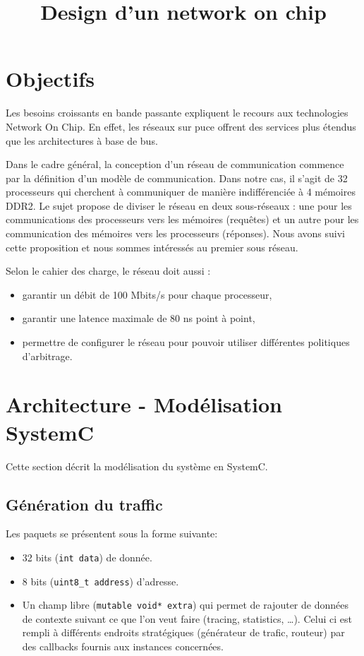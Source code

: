 \documentclass[11pt]{article}
\title{Design d'un network on chip}
\begin{document}
\maketitle

\section{Objectifs}

Les besoins croissants en bande passante expliquent le recours
aux technologies Network On Chip. En effet, les réseaux sur puce offrent des
services plus étendus que les architectures à base de bus.


Dans le cadre général, la conception d'un réseau de communication commence
par la définition d'un modèle de communication. Dans notre cas, il s'agit de 32
processeurs qui cherchent à communiquer de manière indifférenciée à 4 mémoires
DDR2. Le sujet propose de diviser le réseau en deux sous-réseaux : une pour les
communications des processeurs vers les mémoires (requêtes) et un autre pour les
communication des mémoires vers les processeurs (réponses). Nous avons suivi
cette proposition et nous sommes intéressés au premier sous réseau.

Selon le cahier des charge, le réseau doit aussi :
\begin{itemize}
  \item garantir un débit de 100 Mbits/s pour chaque processeur,
  \item garantir une latence maximale de 80 ns point à point,
  \item permettre de configurer le réseau pour pouvoir utiliser différentes
    politiques d'arbitrage.
\end{itemize}

\section{Architecture - Modélisation SystemC}

Cette section décrit la modélisation du système en SystemC.

\subsection{Génération du traffic}

Les paquets se présentent sous la forme suivante:
\begin{itemize}
  \item 32 bits (\texttt{int data}) de donnée.
  \item 8 bits (\texttt{uint8\_t address}) d'adresse.
  \item Un champ libre (\texttt{mutable void* extra}) qui permet de rajouter de
    données de contexte suivant ce que l'on veut faire (tracing, statistics,
    \ldots). Celui ci est rempli à différents endroits stratégiques
    (générateur de trafic, routeur) par des callbacks fournis aux instances
    concernées.
\end{itemize}
\end{document}
